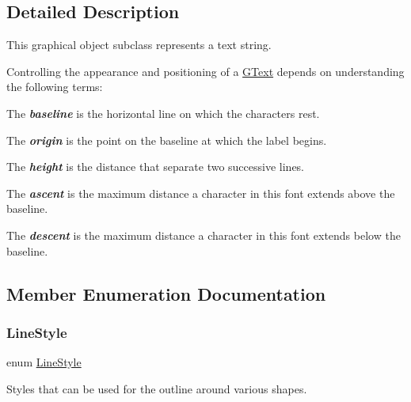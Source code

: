 \subsection{Detailed Description}
This graphical object subclass represents a text string. 

Controlling the appearance and positioning of a {\ttfamily \mbox{\hyperlink{classsgl_1_1GText}{G\+Text}}} depends on understanding the following terms\+:


\begin{DoxyItemize}
\item The {\bfseries {\itshape baseline}} is the horizontal line on which the characters rest. 
\item The {\bfseries {\itshape origin}} is the point on the baseline at which the label begins. 
\item The {\bfseries {\itshape height}} is the distance that separate two successive lines. 
\item The {\bfseries {\itshape ascent}} is the maximum distance a character in this font extends above the baseline. 
\item The {\bfseries {\itshape descent}} is the maximum distance a character in this font extends below the baseline. 
\end{DoxyItemize}

\subsection{Member Enumeration Documentation}
\mbox{\label{classsgl_1_1GObject_a86e0f5648542856159bb40775c854aa7}} 
\subsubsection{\texorpdfstring{Line\+Style}{LineStyle}}
{\footnotesize\ttfamily enum \mbox{\hyperlink{classsgl_1_1GObject_a86e0f5648542856159bb40775c854aa7}{Line\+Style}}\hspace{0.3cm}{\ttfamily [inherited]}}



Styles that can be used for the outline around various shapes. 

